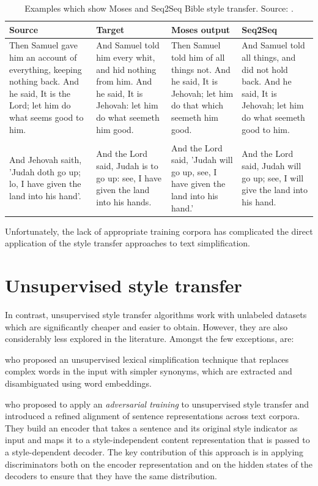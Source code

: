 \begin{table}[h]
\centering
\begin{tabular}{p{3.1cm}p{3.1cm}p{3.1cm}p{3.1cm}}
\hline
\textbf{Source} & \textbf{Target} & \textbf{Moses output} & \textbf{Seq2Seq} \\
\hline
Then Samuel gave him an account of everything, keeping nothing back. And he said, It is the Lord; let him do what seems good to him. & And Samuel told him every whit, and hid nothing from him. And he said, It is Jehovah: let him do what seemeth him good. & Then Samuel told him of all things not. And he said, It is Jehovah; let him do that which seemeth him good. & And Samuel told all things, and did not hold back. And he
said, It is Jehovah; let him do what seemeth good to him.\\
&&& \\
And Jehovah saith, 'Judah doth go up; lo, I have given the land into his hand'. & And the Lord said, Judah is to go up: see, I have given the land into his hands. & And the Lord said, 'Judah will go up, see, I have given the land into his hand.' & And the Lord said, Judah will go up; see, I will give the land into his hand.\\
\hline
\end{tabular}
\caption{Examples which show Moses and Seq2Seq Bible style transfer. Source: \cite{carlson-bible}.}
\label{tab:bible-style-transfer}
\end{table}

Unfortunately, the lack of appropriate training corpora has complicated the direct application of the style transfer approaches to text simplification.  

\section{Unsupervised style transfer}

In contrast, unsupervised style transfer algorithms work with unlabeled datasets which are significantly cheaper and easier to obtain. However, they are also considerably less explored in the literature. Amongst the few exceptions, are: 

\cite{Paetzold:2016:ULS:3016387.3016433} who proposed an unsupervised lexical simplification technique that replaces complex words in the input with simpler synonyms, which are extracted and disambiguated using word embeddings. 

\cite{Shen:2017:STN:3295222.3295427} who proposed to apply an \emph{adversarial training} to unsupervised style transfer and introduced a refined alignment of sentence representations across text corpora. They build an encoder that takes a sentence and its original style indicator as input and maps it to a style-independent content representation that is passed to a style-dependent decoder. The key contribution of this approach is in applying discriminators both on the encoder representation and on the hidden states of the decoders to ensure that they have the same distribution.

